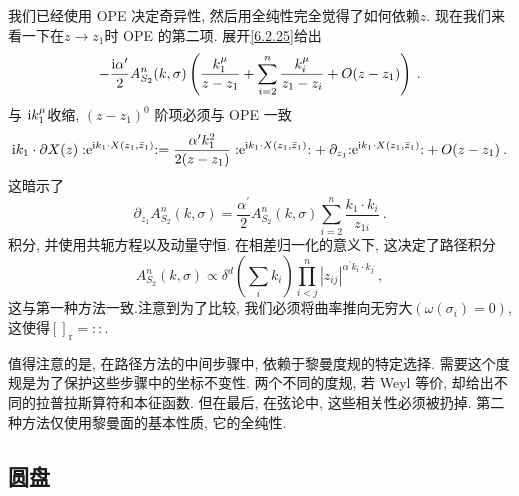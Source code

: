 我们已经使用 OPE 决定奇异性, 然后用全纯性完全觉得了如何依赖$z$. 现在我们来看一下在$z \rightarrow z_{1}$时 OPE 的第二项. 
展开\eqref{6.2.25}给出
\begin{equation}
	-\frac{\mathrm{i} \alpha^{\prime}}{2} A_{S_{2}}^{n}(k, \sigma)\left(\frac{k_{1}^{\mu}}{z-z_{1}}+\sum_{i=2}^{n} \frac{k_{i}^{\mu}}{z_{1}-z_{i}}+O(z-z_{1})\right) \:. \label{6.2.28}
\end{equation}
与 $\mathrm{i} k_{1}^{\mu}$收缩,  $(z-z_{1})^{0}$ 阶项必须与 OPE 一致
	\begin{align}
		\mathrm{i} k_{1} \cdot \partial X(z): \mathrel{\mathrm{e}^{\mathrm{i} k_{1} \cdot X(z_{1}, \bar{z}_{1})}}: =\frac{\alpha^{\prime} k_{1}^{2}}{2(z-z_{1})} :\mathrel{\mathrm{e}^{\mathrm{i} k_{1} \cdot X(z_{1}, \bar{z}_{1})}}:
		+ \: \partial_{z_{1}}{:\mathrel{\mathrm{e}^{\mathrm{i} k_{1} \cdot X(z_{1}, \bar{z}_{1})}}:}+ O(z-z_{1}) \:. \label{6.2.29}
	\end{align}
这暗示了
\begin{equation}
	\partial_{z_{1}} A_{S_{2}}^{n}(k, \sigma)=\frac{\alpha^{\prime}}{2} A_{S_{2}}^{n}(k, \sigma) \sum_{i=2}^{n} \frac{k_{1} \cdot k_{i}}{z_{1 i}} \:. \label{6.2.30}
\end{equation}
积分, 并使用共轭方程以及动量守恒. 在相差归一化的意义下, 这决定了路径积分
\begin{equation}
	A_{S_{2}}^{n}(k, \sigma) \propto \delta^{d}({\textstyle \sum_{i} k_{i}}) 
	\prod_{i<j}^{n} |z_{i j}|^{\alpha^{\prime} k_{i} \cdot k_{j}} \:, \label{6.2.31}
\end{equation}
这与第一种方法一致.注意到为了比较, 我们必须将曲率推向无穷大$(\omega(\sigma_{i})=0)$, 这使得$[]_{\mathrm{r}}=::$.

值得注意的是, 在路径方法的中间步骤中, 依赖于黎曼度规的特定选择. 需要这个度规是为了保护这些步骤中的坐标不变性. 
两个不同的度规, 若 Weyl 等价, 却给出不同的拉普拉斯算符和本征函数. 但在最后, 在弦论中, 这些相关性必须被扔掉. 
第二种方法仅使用黎曼面的基本性质, 它的全纯性.


\subsection*{圆盘}

